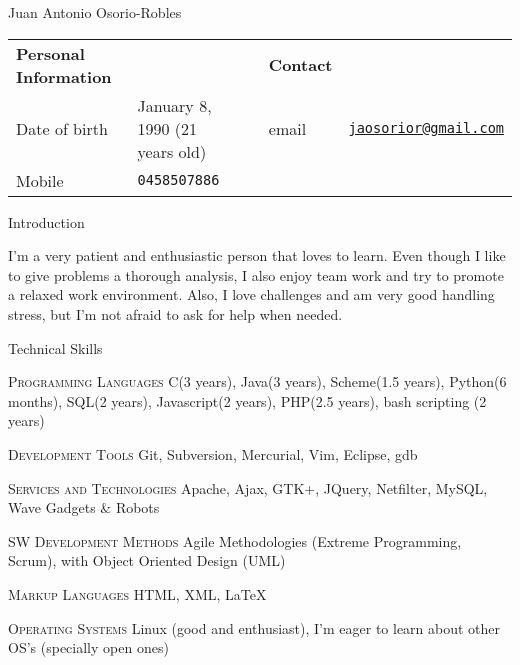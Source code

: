 \documentclass[spanish,10pt,letterpaper]{article}
\begin{document}
\centering
\begin{cv}{Juan Antonio Osorio-Robles}


	\begin{table}[h]
		\begin{tabular}{@{} l l p{0.5cm} l r}
			{\bf Personal Information}	&	&	&	{\bf Contact}	&	\\
			Date of birth &	January 8, 1990 (21 years old)	&	&
			email	&	\href{mailto:jaosorior@gmail.com}	{\tt jaosorior@gmail.com}	\\
			Mobile &	{\tt 0458507886}
		\end{tabular}
	\end{table}

	\begin{cvlist}{Introduction}
		\item[	]
			I'm a very patient and enthusiastic person that loves to learn. Even though I like to give problems a thorough analysis, I also enjoy team work and try to promote a relaxed work environment. Also, I love challenges and am very good handling stress, but I'm not afraid to ask for help when needed.
	\end{cvlist}


	\begin{cvlist}{Technical Skills}
			\item [\textsc{Programming Languages}]
				C(3 years), Java(3 years), Scheme(1.5 years), Python(6 months), SQL(2 years), Javascript(2 years), PHP(2.5 years), bash scripting (2 years)
			\item [\textsc{Development Tools}]
				Git, Subversion, Mercurial, Vim, Eclipse, gdb
			\item [\textsc {Services and Technologies}]
				Apache, Ajax, GTK+, JQuery, Netfilter, MySQL, Wave Gadgets \& Robots
			\item [\textsc {SW Development Methods}]
				Agile Methodologies (Extreme Programming, Scrum), with Object Oriented Design (UML)
			\item [\textsc {Markup Languages}]
				HTML, XML,
				\LaTeX
			\item [\textsc {Operating Systems}]
				Linux (good and enthusiast), I'm eager to learn about other OS's (specially open ones)
	\end{cvlist}


\end{cv}
\end{document}
